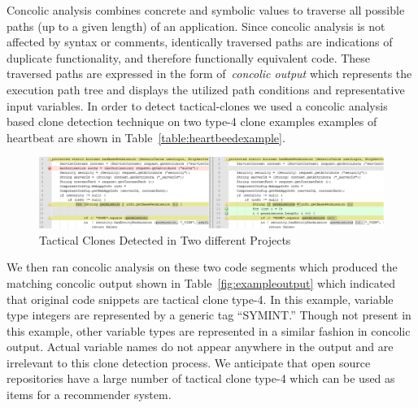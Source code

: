 






Concolic analysis combines concrete and symbolic values to traverse all possible paths (up to a given length) of an application. Since concolic analysis is not affected by syntax or comments, identically traversed paths are indications of duplicate functionality, and therefore functionally equivalent code. These traversed paths are expressed in the form of~\emph{concolic output} which represents the execution path tree and displays the utilized path conditions and representative input variables. In order to detect tactical-clones we used a concolic analysis based clone detection technique \cite{wcre2013,Dan123} on two type-4 clone examples examples of heartbeat are shown in Table~\ref{table:heartbeedexample}.
\begin{figure}[!t]
\vspace{-1pt}
\centering
\includegraphics[width=0.9\linewidth]{./img/Permission}
\vspace{-6pt}
\caption{Tactical Clones Detected in Two different Projects}
\label{fig:Permission}
\vspace{-1pt}
\end{figure}




We then ran concolic analysis on these two code segments which produced the matching concolic output shown in Table~\ref{fig:exampleoutput} which indicated that original code snippets are tactical clone type-4. In this example, variable type integers are represented by a generic tag ``SYMINT.'' Though not present in this example, other variable types are represented in a similar fashion in concolic output. Actual variable names do not appear anywhere in the output and are irrelevant to this clone detection process. We anticipate that open source repositories have a large number of tactical clone type-4 which can be used as items for a recommender system.


